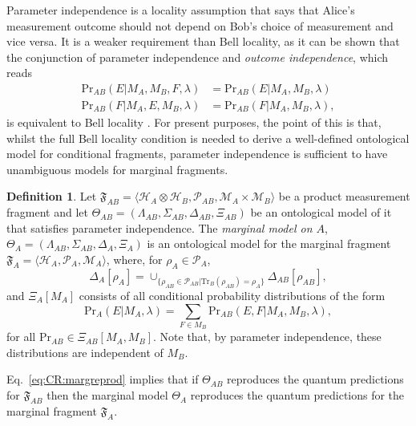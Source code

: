 \documentclass[DIV=calc,paper=a4,fontsize=11pt,twocolumn]{scrartcl} %
\theoremstyle{definition}
\newtheorem{definition}{Definition}[section]
\theoremstyle{plain}
\newcommand{\Hilb}[1][]{\ensuremath{\mathcal{H}_{#1}}}
\newcommand{\Tr}[2][]{\ensuremath{\text{Tr}_{#1} \left ( #2 \right )}}
\begin{document}
Parameter independence is a locality assumption that says that Alice's
measurement outcome should not depend on Bob's choice of measurement
and vice versa.  It is a weaker requirement than Bell locality, as it
can be shown that the conjunction of parameter independence and
\emph{outcome independence}, which reads
\begin{align}
\text{Pr}_{AB}(E|M_A,M_B,F,\lambda) & = \text{Pr}_{AB}(E|M_A,M_B,\lambda) \\
\text{Pr}_{AB}(F|M_A,E,M_B,\lambda) & = \text{Pr}_{AB}(F|M_A,M_B,\lambda),
\end{align}
is equivalent to Bell locality \cite{Jarrett1984, Shimony1993}.  For
present purposes, the point of this is that, whilst the full Bell
locality condition is needed to derive a well-defined ontological
model for conditional fragments, parameter independence is sufficient
to have unambiguous models for marginal fragments.

\begin{definition}
Let $\mathfrak{F}_{AB} = \langle \Hilb[A] \otimes \Hilb[B],
\mathcal{P}_{AB}, \mathcal{M}_A \times \mathcal{M}_B \rangle$ be a
product measurement fragment and let $\Theta_{AB} = ( \Lambda_{AB},
\Sigma_{AB}, \Delta_{AB}, \Xi_{AB} )$ be an ontological model of it
that satisfies parameter independence.  The \emph{marginal model on
$A$}, $\Theta_A = (\Lambda_{AB}, \Sigma_{AB}, \Delta_A, \Xi_A)$ is an
ontological model for the marginal fragment $\mathfrak{F}_A =
\langle \Hilb[A], \mathcal{P}_A, \mathcal{M}_A \rangle$, where, for
$\rho_A \in \mathcal{P}_A$,
\begin{equation}
\Delta_A[\rho_A] =  \cup_{\{\rho_{AB} \in
\mathcal{P}_{AB}|\Tr[B]{\rho_{AB}} = \rho_A\}} \Delta_{AB}[\rho_{AB}],
\end{equation}
and $\Xi_A[M_A]$ consists of all conditional probability
distributions of the form
\begin{equation}
\text{Pr}_A(E|M_A, \lambda) = \sum_{F \in M_B}
\text{Pr}_{AB}(E,F|M_A,M_B, \lambda),
\end{equation}
for all $\text{Pr}_{AB} \in \Xi_{AB}[M_A,M_B]$.  Note that, by
parameter independence, these distributions are independent of
$M_B$.
\end{definition}

Eq.~\eqref{eq:CR:margreprod} implies that if $\Theta_{AB}$ reproduces the
quantum predictions for $\mathfrak{F}_{AB}$ then the marginal model
$\Theta_A$ reproduces the quantum predictions for the marginal fragment
$\mathfrak{F}_A$.
\end{document}
